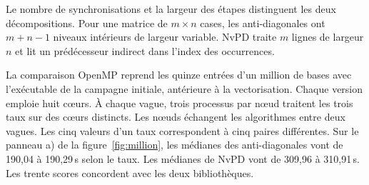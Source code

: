Le nombre de synchronisations et la largeur des étapes distinguent les deux décompositions. Pour une matrice de \(m\times n\) cases, les anti-diagonales ont \(m+n-1\) niveaux intérieurs de largeur variable. NvPD traite \(m\) lignes de largeur \(n\) et lit un prédécesseur indirect dans l'index des occurrences.

La comparaison OpenMP reprend les quinze entrées d'un million de bases avec l'exécutable de la campagne initiale, antérieure à la vectorisation. Chaque version emploie huit cœurs. À chaque vague, trois processus par nœud traitent les trois taux sur des cœurs distincts. Les nœuds échangent les algorithmes entre deux vagues. Les cinq valeurs d'un taux correspondent à cinq paires différentes.
Sur le panneau a) de la figure~\ref{fig:million}, les médianes des anti-diagonales vont de 190,04 à 190,29\,s selon le taux. Les médianes de NvPD vont de 309,96 à 310,91\,s. Les trente scores concordent avec les deux bibliothèques.
